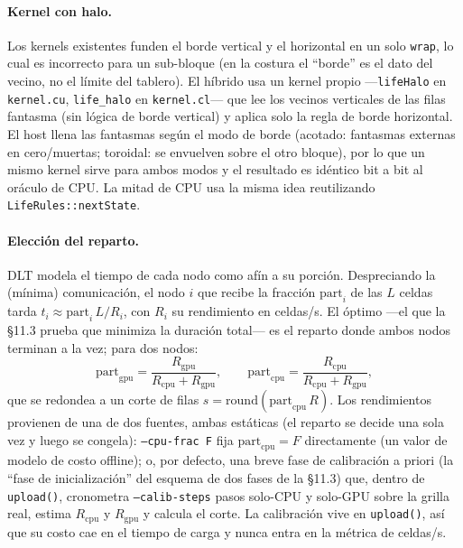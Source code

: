 \documentclass[
	spanish,
	letterpaper, oneside
]{article}
\begin{document}
\paragraph{Kernel con halo.} Los kernels existentes funden el borde vertical y el
horizontal en un solo \texttt{wrap}, lo cual es incorrecto para un sub-bloque (en la
costura el ``borde'' es el dato del vecino, no el límite del tablero). El híbrido usa
un kernel propio ---\texttt{lifeHalo} en \texttt{kernel.cu}, \texttt{life\_halo} en
\texttt{kernel.cl}--- que lee los vecinos verticales de las filas fantasma
(sin lógica de borde vertical) y aplica solo la regla de borde horizontal. El
host llena las fantasmas según el modo de borde (acotado: fantasmas externas
en cero/muertas; toroidal: se envuelven sobre el otro bloque), por lo que un mismo
kernel sirve para ambos modos y el resultado es idéntico bit a bit al oráculo de CPU.
La mitad de CPU usa la misma idea reutilizando \texttt{LifeRules::nextState}.

\paragraph{Elección del reparto.} DLT modela el tiempo de cada nodo como afín a su
porción. Despreciando la (mínima) comunicación, el nodo $i$ que recibe la fracción
$\mathrm{part}_i$ de las $L$ celdas tarda $t_i \approx \mathrm{part}_i\,L / R_i$, con
$R_i$ su rendimiento en celdas/s. El óptimo ---el que la \S11.3 prueba que minimiza
la duración total--- es el reparto donde ambos nodos terminan a la vez; para
dos nodos:
%
\begin{equation}
	\mathrm{part}_{\mathrm{gpu}} = \frac{R_{\mathrm{gpu}}}{R_{\mathrm{cpu}}+R_{\mathrm{gpu}}},
	\qquad
	\mathrm{part}_{\mathrm{cpu}} = \frac{R_{\mathrm{cpu}}}{R_{\mathrm{cpu}}+R_{\mathrm{gpu}}},
	\label{eq:dlt-split}
\end{equation}
%
que se redondea a un corte de filas $s = \mathrm{round}(\mathrm{part}_{\mathrm{cpu}}\,R)$.
Los rendimientos provienen de una de dos fuentes, ambas estáticas (el reparto
se decide una sola vez y luego se congela): \texttt{--cpu-frac F} fija
$\mathrm{part}_{\mathrm{cpu}}=F$ directamente (un valor de modelo de costo offline);
o, por defecto, una breve fase de calibración a priori (la ``fase de
inicialización'' del esquema de dos fases de la \S11.3) que, dentro de
\texttt{upload()}, cronometra \texttt{--calib-steps} pasos solo-CPU y solo-GPU sobre
la grilla real, estima $R_{\mathrm{cpu}}$ y $R_{\mathrm{gpu}}$ y calcula el corte. La
calibración vive en \texttt{upload()}, así que su costo cae en el tiempo de carga y
nunca entra en la métrica de celdas/s.
\end{document}
